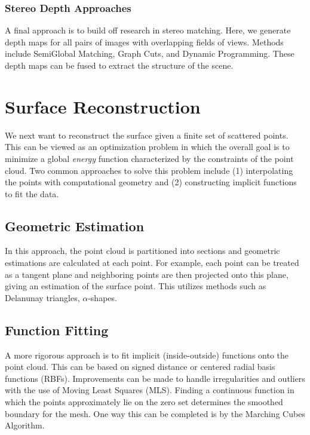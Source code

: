 \documentclass[10pt,twocolumn,letterpaper]{article}
\begin{document}
\subsubsection{Stereo Depth Approaches}

A final approach is to build off research in stereo matching. Here, we generate depth maps for all pairs of images with overlapping fields of views. Methods include SemiGlobal Matching, Graph Cuts, and Dynamic Programming.\cite{sgm,taxonomy} These depth maps can be fused to extract the structure of the scene.\cite{fuse}


\section{Surface Reconstruction}
We next want to reconstruct the surface given a finite set of scattered points.  This can be viewed as an optimization problem in which the overall goal is to minimize a global \textit{energy} function characterized by the constraints of the point cloud. \cite{mesh_opt}  Two common approaches to solve this problem include (1) interpolating the points with computational geometry and (2) constructing implicit functions to fit the data.

\subsection{ Geometric Estimation }
In this approach, the point cloud is partitioned into sections and geometric estimations are calculated at each point. For example, each point can be treated as a tangent plane and neighboring points are then projected onto this plane, giving an estimation of the surface point.\cite{surface_review, hoppe1992surface}  This utilizes methods such as Delanunay triangles, $\alpha$-shapes. \cite{surface_review, poisson} 

\subsection{ Function Fitting}
A more rigorous approach is to fit implicit (inside-outside) functions onto the point cloud.  This can be based on signed distance or centered radial basis functions (RBFs).\cite{poisson}  Improvements can be made to handle irregularities and outliers with the use of Moving Least Squares (MLS).\cite{szeliski2010computer}  Finding a continuous function in which the points approximately lie on the zero set determines the smoothed boundary for the mesh.  One way this can be completed is by the Marching Cubes Algorithm.\cite{hoppe1992surface}
\end{document}
